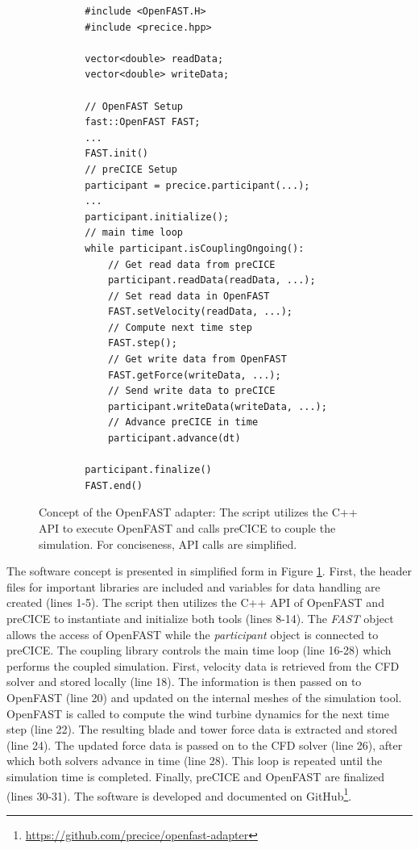 \begin{figure}[b!]
	\centering
	\begin{minipage}{0.9\textwidth}
		\begin{verbatim}
		#include <OpenFAST.H>
		#include <precice.hpp>
		
		vector<double> readData;
		vector<double> writeData;
		
		// OpenFAST Setup
		fast::OpenFAST FAST;
		...
		FAST.init()
		// preCICE Setup
		participant = precice.participant(...);
		...
		participant.initialize();
		// main time loop
		while participant.isCouplingOngoing(): 
			// Get read data from preCICE
			participant.readData(readData, ...);
			// Set read data in OpenFAST
			FAST.setVelocity(readData, ...);
			// Compute next time step
			FAST.step();
			// Get write data from OpenFAST
			FAST.getForce(writeData, ...);
			// Send write data to preCICE
			participant.writeData(writeData, ...);
			// Advance preCICE in time
			participant.advance(dt) 
		
		participant.finalize()
		FAST.end()
		\end{verbatim}
	\end{minipage}
	\caption{Concept of the OpenFAST adapter: The script utilizes the C++ API to execute OpenFAST and calls preCICE to couple the simulation. For conciseness, API calls are simplified.}
	\label{code:adapter}
\end{figure}

The software concept is presented in simplified form in Figure \ref{code:adapter}. First, the header files for important libraries are included and variables for data handling are created (lines 1-5). The script then utilizes the C++ API of OpenFAST and preCICE to instantiate and initialize both tools (lines 8-14). The \textit{FAST} object allows the access of OpenFAST while the \textit{participant} object is connected to preCICE. The coupling library controls the main time loop (line 16-28) which performs the coupled simulation. First, velocity data is retrieved from the CFD solver and stored locally (line 18). The information is then passed on to OpenFAST (line 20) and updated on the internal meshes of the simulation tool. OpenFAST is called to compute the wind turbine dynamics for the next time step (line 22). The resulting blade and tower force data is extracted and stored (line 24). The updated force data is passed on to the CFD solver (line 26), after which both solvers advance in time (line 28). This loop is repeated until the simulation time is completed. Finally, preCICE and OpenFAST are finalized (lines 30-31). The software is developed and documented on GitHub\footnote{\url{https://github.com/precice/openfast-adapter}}. 